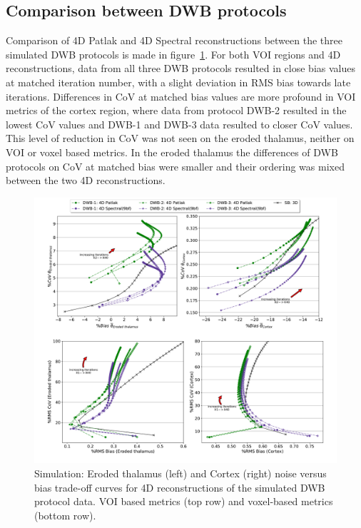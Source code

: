 \subsection*{Comparison between DWB protocols}
Comparison of 4D Patlak and 4D Spectral reconstructions between the three simulated DWB protocols is made in figure~\ref{fig:3_4_ComparingDWBProtocols}. For both VOI regions and 4D reconstructions, data from all three DWB protocols resulted in close bias values at matched iteration number, with a slight deviation in RMS bias towards late iterations.
Differences in CoV at matched bias values are more profound in VOI metrics of the cortex region, where data from protocol DWB-2 resulted in the lowest CoV values and DWB-1 and DWB-3 data resulted to closer CoV values. This level of reduction in CoV was not seen on the eroded thalamus, neither on VOI or voxel based metrics. In the eroded thalamus the differences of DWB protocols on CoV at matched  bias were smaller and their ordering was mixed between the two 4D reconstructions. 

\begin{figure} [ht!]
\centering
\includegraphics[scale=0.42,angle=0]{3_Results/3_2_Dynamic_Reconstruction_SimulationStudy/figures/VOI/3_4.pdf}
\caption{Simulation: Eroded thalamus (left) and Cortex (right) noise versus bias trade-off curves for 4D reconstructions of the simulated DWB protocol data. VOI based metrics (top row) and voxel-based metrics (bottom row).} 
\label{fig:3_4_ComparingDWBProtocols}
\end{figure} 

